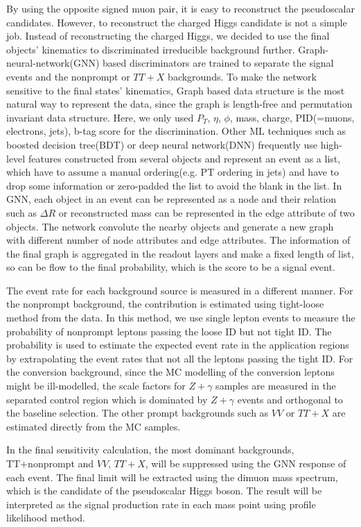 \documentclass[
12pt, %
a4paper, %
oneside, %
headinclude,footinclude, %
BCOR5mm, %
]{scrartcl}
\begin{document}
By using the opposite signed muon pair, it is easy to reconstruct the pseudoscalar candidates.
However, to reconstruct the charged Higgs candidate is not a simple job. Instead of reconstructing
the charged Higgs, we decided to use the final objects' kinematics 
to discriminated irreducible background further.
Graph-neural-network(GNN) based discriminators\cite{GNN}\cite{ParticleNet} are trained to separate the signal events 
and the nonprompt or $TT + X$ backgrounds. 
To make the network sensitive to the final states' kinematics, Graph based data structure
is the most natural way to represent the data, since the graph is length-free and permutation invariant data structure.
Here, we only used $P_T$, $\eta$, $\phi$, mass, charge, PID(=muons, electrons, jets), b-tag score for the discrimination.
Other ML techniques such as boosted decision tree(BDT) or deep neural network(DNN) frequently use high-level
features constructed from several objects and represent an event
as a list, which have to assume a manual ordering(e.g. PT ordering in jets) and have to drop some information or
zero-padded the list to avoid the blank in the list.
In GNN, each object in an event can be represented as a node and their relation such as $\Delta R$ or reconstructed mass
can be represented in the edge attribute of two objects. The network convolute the nearby objects and generate a new graph
with different number of node attributes and edge attributes. The information of the final graph is aggregated in the readout
layers and make a fixed length of list, so can be flow to the final probability, which is the score to be a signal event.

The event rate for each background source is measured in a different manner.
For the nonprompt background, the contribution is estimated using tight-loose method from the data. 
In this method, we use single lepton events to measure the probability of nonprompt leptons passing the loose ID but not tight ID. 
The probability is used to estimate the expected event rate in the application regions 
by extrapolating the event rates that not all the leptons passing the tight ID. 
For the conversion background, since the MC modelling of the conversion leptons might be ill-modelled, 
the scale factors for $Z+\gamma$ samples are measured in the separated control region 
which is dominated by $Z+\gamma$ events and orthogonal to the baseline selection.
The other prompt backgrounds such as $VV$ or $TT + X$ are estimated directly from the MC samples.

In the final sensitivity calculation, the most dominant backgrounds, 
TT+nonprompt and $VV$, $TT + X$, 
will be suppressed using the GNN response of each event.
The final limit will be extracted using the dimuon mass spectrum, which is the candidate
of the pseudoscalar Higgs boson.
The result will be interpreted as the signal production rate in each mass point using profile likelihood method\cite{limit}.
\end{document}
